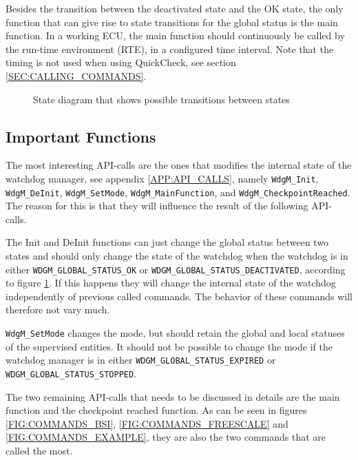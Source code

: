 Besides the transition between the deactivated state and the OK state,
the only function that can give rise to state transitions for the
global status is the main function. In a working ECU, the main
function should continuously be called by the run-time environment
(RTE), in a configured time interval. Note that the timing is not used
when using QuickCheck, see section \ref{SEC:CALLING_COMMANDS}.

\begin{figure}[h!]
  \begin{center}
    
  \end{center}
  \caption{State diagram that shows possible transitions between states}
  \label{FIG:GLOBALSTATUSES}
\end{figure}

\subsection{Important Functions}
The most interesting API-calls are the ones that modifies the internal
state of the watchdog manager, see appendix \ref{APP:API_CALLS},
namely \lstinline!WdgM_Init!, \lstinline!WdgM_DeInit!,
\lstinline!WdgM_SetMode!, \lstinline!WdgM_MainFunction!, and
\lstinline!WdgM_CheckpointReached!. The reason for this is that they
will influence the result of the following API-calls.

The Init and DeInit functions can just change the global status
between two states and should only change the state of the watchdog
when the watchdog is in either \lstinline!WDGM_GLOBAL_STATUS_OK! or
\lstinline!WDGM_GLOBAL_STATUS_DEACTIVATED!, according to figure
\ref{FIG:GLOBALSTATUSES}. If this happens they will change the
internal state of the watchdog independently of previous called
commands. The behavior of these commands will therefore not vary much.

\lstinline!WdgM_SetMode! changes the mode, but should retain the
global and local statuses of the supervised entities. It should not be
possible to change the mode if the watchdog manager is in either
\lstinline!WDGM_GLOBAL_STATUS_EXPIRED! or
\lstinline!WDGM_GLOBAL_STATUS_STOPPED!.

The two remaining API-calls that needs to be discussed in details are
the main function and the checkpoint reached function. As can be seen
in figures \ref{FIG:COMMANDS_BSI}, \ref{FIG:COMMANDS_FREESCALE} and
\ref{FIG:COMMANDS_EXAMPLE}, they are also the two commands that are
called the most.

